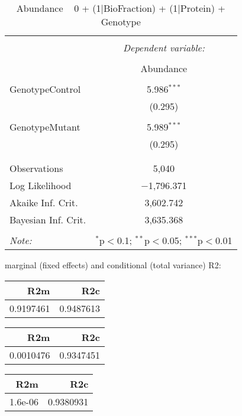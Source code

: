 \documentclass[11pt]{report}
\begin{document}
\begin{table}[!htbp] \centering 
  \caption{Abundance ~ 0 + (1|BioFraction) + (1|Protein) + Genotype} 
  \label{} 
\begin{tabular}{@{\extracolsep{5pt}}lc} 
\\[-1.8ex]\hline 
\hline \\[-1.8ex] 
 & \multicolumn{1}{c}{\textit{Dependent variable:}} \\ 
\cline{2-2} 
\\[-1.8ex] & Abundance \\ 
\hline \\[-1.8ex] 
 GenotypeControl & 5.986$^{***}$ \\ 
  & (0.295) \\ 
  & \\ 
 GenotypeMutant & 5.989$^{***}$ \\ 
  & (0.295) \\ 
  & \\ 
\hline \\[-1.8ex] 
Observations & 5,040 \\ 
Log Likelihood & $-$1,796.371 \\ 
Akaike Inf. Crit. & 3,602.742 \\ 
Bayesian Inf. Crit. & 3,635.368 \\ 
\hline 
\hline \\[-1.8ex] 
\textit{Note:}  & \multicolumn{1}{r}{$^{*}$p$<$0.1; $^{**}$p$<$0.05; $^{***}$p$<$0.01} \\ 
\end{tabular} 
\end{table} 
marginal (fixed effects) and conditional (total variance) R2:

\begin{tabular}{r|r}
\hline
R2m & R2c\\
\hline
0.9197461 & 0.9487613\\
\hline
\end{tabular}

\begin{tabular}{r|r}
\hline
R2m & R2c\\
\hline
0.0010476 & 0.9347451\\
\hline
\end{tabular}

\begin{tabular}{r|r}
\hline
R2m & R2c\\
\hline
1.6e-06 & 0.9380931\\
\hline
\end{tabular}
\end{document}
